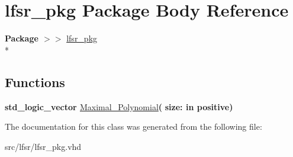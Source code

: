 \hypertarget{class__lfsr__pkg}{\section{lfsr\-\_\-pkg Package Body Reference}
\label{class__lfsr__pkg}
}
{\bfseries Package $>$$>$ }\hyperlink{classlfsr__pkg}{lfsr\-\_\-pkg}\\*
\subsection*{Functions}
 \begin{DoxyCompactItemize}
\item 
\hypertarget{class__lfsr__pkg_aa892d93dafd63bb0a40765dec3e73940}{{\bfseries {\bfseries \textcolor{comment}{std\-\_\-logic\-\_\-vector}\textcolor{vhdlchar}{ }}} \hyperlink{class__lfsr__pkg_aa892d93dafd63bb0a40765dec3e73940}{Maximal\-\_\-\-Polynomial}{\bfseries  ( }{\bfseries \textcolor{vhdlchar}{size\-: }\textcolor{stringliteral}{in }\textcolor{vhdlchar}{positive}}{\bfseries  )} }\label{class__lfsr__pkg_aa892d93dafd63bb0a40765dec3e73940}

\end{DoxyCompactItemize}


The documentation for this class was generated from the following file\-:\begin{DoxyCompactItemize}
\item 
src/lfsr/lfsr\-\_\-pkg.\-vhd\end{DoxyCompactItemize}
